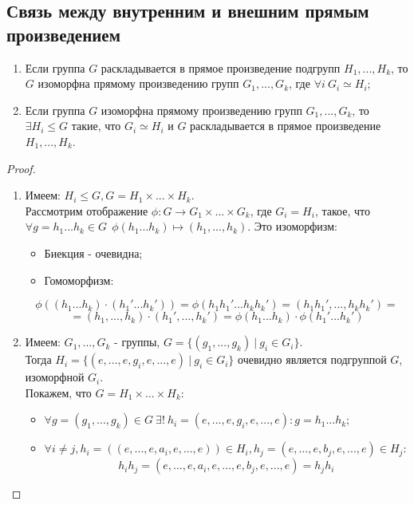 \subsection{Связь между внутренним и внешним прямым произведением}
\begin{theoremnum}\tab
    \begin{enumerate}
        \item Если группа $G$ раскладывается в прямое произведение подгрупп $H_1,...,H_k$, то $G$ изоморфна прямому произведению групп $G_1,...,G_k$, где $\forall i \ G_i \simeq H_i$;
        \item Если группа $G$ изоморфна прямому произведению групп $G_1,...,G_k$, то $\exists H_i \leq G$ такие, что $G_i \simeq H_i$ и $G$ раскладывается в прямое произведение $H_1,...,H_k$.
    \end{enumerate}
\end{theoremnum}
\begin{proof}\tab
    \begin{enumerate}
        \item Имеем: $H_i \leq G, G = H_1 \times ... \times H_k$.\\
        Рассмотрим отображение $\phi: G \rightarrow G_1 \times ... \times G_k$, где $G_i = H_i$, такое, что $\forall g = h_1...h_k \in G \ \ \phi(h_1...h_k) \mapsto (h_1,...,h_k)$. Это изоморфизм:
        \begin{itemize}
            \item Биекция - очевидна;
            \item Гомоморфизм:
        \end{itemize}
        \[\phi((h_1...h_k)\cdot(h_1'...h_k')) = \phi(h_1h_1'...h_kh_k') = (h_1h_1',...,h_kh_k') =\]
        \[= (h_1,...,h_k)\cdot(h_1',...,h_k') = \phi(h_1...h_k) \cdot \phi(h_1'...h_k')\]
        \item Имеем: $G_1,...,G_k$ - группы, $G = \{(g_1,...,g_k) \ | \ g_i \in G_i\}$.\\
        Тогда $H_i = \{(e,...,e,g_i,e,...,e) \ | \ g_i \in G_i\}$ очевидно является подгруппой $G$, изоморфной $G_i$.\\
        Покажем, что $G = H_1 \times ... \times H_k$:
        \begin{itemize}
            \item $\forall g = (g_1,...,g_k) \in G \ \exists! \ h_i  = (e,...,e,g_i,e,...,e): g = h_1...h_k$;
            \item $\forall i \neq j, h_i = ((e,...,e,a_i,e,...,e)) \in H_i, h_j = (e,...,e,b_j,e,...,e) \in H_j:$
            \[h_ih_j = (e,...,e,a_i,e,...,e, b_j,e,...,e) = h_jh_i\]
        \end{itemize}
    \end{enumerate}
\end{proof}
